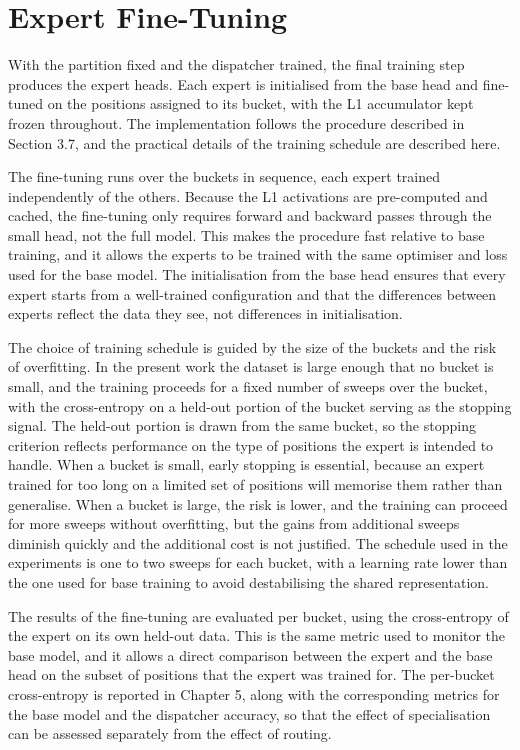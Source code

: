 \section{Expert Fine-Tuning}

With the partition fixed and the dispatcher trained, the final training step produces the expert heads. Each expert is initialised from the base head and fine-tuned on the positions assigned to its bucket, with the L1 accumulator kept frozen throughout. The implementation follows the procedure described in Section 3.7, and the practical details of the training schedule are described here.

The fine-tuning runs over the buckets in sequence, each expert trained independently of the others. Because the L1 activations are pre-computed and cached, the fine-tuning only requires forward and backward passes through the small head, not the full model. This makes the procedure fast relative to base training, and it allows the experts to be trained with the same optimiser and loss used for the base model. The initialisation from the base head ensures that every expert starts from a well-trained configuration and that the differences between experts reflect the data they see, not differences in initialisation.


The choice of training schedule is guided by the size of the buckets and the risk of overfitting. In the present work the dataset is large enough that no bucket is small, and the training proceeds for a fixed number of sweeps over the bucket, with the cross-entropy on a held-out portion of the bucket serving as the stopping signal. The held-out portion is drawn from the same bucket, so the stopping criterion reflects performance on the type of positions the expert is intended to handle. When a bucket is small, early stopping is essential, because an expert trained for too long on a limited set of positions will memorise them rather than generalise. When a bucket is large, the risk is lower, and the training can proceed for more sweeps without overfitting, but the gains from additional sweeps diminish quickly and the additional cost is not justified. The schedule used in the experiments is one to two sweeps for each bucket, with a learning rate lower than the one used for base training to avoid destabilising the shared representation.

The results of the fine-tuning are evaluated per bucket, using the cross-entropy of the expert on its own held-out data. This is the same metric used to monitor the base model, and it allows a direct comparison between the expert and the base head on the subset of positions that the expert was trained for. The per-bucket cross-entropy is reported in Chapter 5, along with the corresponding metrics for the base model and the dispatcher accuracy, so that the effect of specialisation can be assessed separately from the effect of routing.



